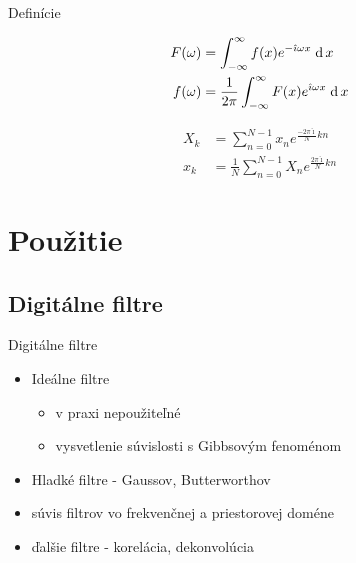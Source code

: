 \documentclass{beamer}
\def\dd{\;{\rm d}\,}
\def\imag{\hat{\imath}}
\begin{document}
\begin{frame}[shrink=10]{Definície}
    \begin{definition}
        \begin{align*}
            F(\omega) &= \int_{-\infty}^{\infty}
                f(x) e^{-\imag \omega x} \dd x \\
            f(\omega) &= \frac{1}{2\pi} \int_{-\infty}^{\infty}
                F(x) e^{\imag \omega x} \dd x
        \end{align*}
    \end{definition}

    \begin{definition}
        \begin{align*}
            X_k &= \sum_{n=0}^{N-1} x_n e^{\frac{-2\pi\imag}{N} k n}\\
            x_k &= \frac{1}{N} \sum_{n=0}^{N-1} X_n e^{\frac{2\pi\imag}{N} kn}
        \end{align*}
    \end{definition}
\end{frame}

\section{Použitie}

\subsection{Digitálne filtre}
\begin{frame}{Digitálne filtre}
    \begin{itemize}
        \item Ideálne filtre
            \begin{itemize}
            \item v praxi nepoužiteľné
            \item vysvetlenie súvislosti s Gibbsovým fenoménom
            \end{itemize}
        \item Hladké filtre - Gaussov, Butterworthov
        \item súvis filtrov vo frekvenčnej a priestorovej doméne
        \item ďalšie filtre - korelácia, dekonvolúcia
    \end{itemize}
\end{frame}
\end{document}
